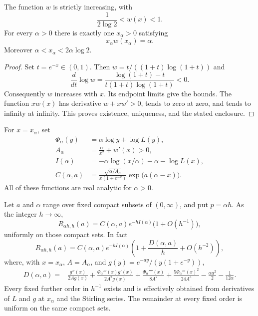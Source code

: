 \begin{lemma}\label{lem:w}
The function $w$ is strictly increasing, with
\[
 \frac1{2\log2}<w(x)<1.
\]
For every $\alpha>0$ there is exactly one $x_\alpha>0$ satisfying
\begin{equation}\label{eq:saddle-equation}
 x_\alpha w(x_\alpha)=\alpha.
\end{equation}
Moreover $\alpha<x_\alpha<2\alpha\log2$.
\end{lemma}
\begin{proof}
Set $t=e^{-x}\in(0,1)$. Then
$w=t/((1+t)\log(1+t))$ and
\[
 \frac{d}{dt}\log w
 =\frac{\log(1+t)-t}{t(1+t)\log(1+t)}<0.
\]
Consequently $w$ increases with $x$. Its endpoint limits give the bounds.
The function $xw(x)$ has derivative $w+xw'>0$, tends to zero at zero,
and tends to infinity at infinity. This proves existence, uniqueness,
and the stated enclosure.
\end{proof}

For $x=x_\alpha$, set
\begin{align}
 \Phi_\alpha(y)&=\alpha\log y+\log L(y),\label{eq:phase}\\
 A_\alpha&=\frac{\alpha}{x^2}+w'(x)>0,\label{eq:A}\\
 I(\alpha)&=-\alpha\log(x/\alpha)-\alpha-\log L(x),\label{eq:rate}\\
 C(\alpha,a)&=
 \frac{\sqrt{\alpha/A_\alpha}}{x(1+e^{-x})}
 \exp\bigl(a(\alpha-x)\bigr).\label{eq:C}
\end{align}
All of these functions are real analytic for $\alpha>0$.

\begin{theorem}\label{thm:saddle}
Let $a$ and $\alpha$ range over fixed compact subsets of $(0,\infty)$,
and put $p=\alpha h$. As the integer $h\to\infty$,
\begin{equation}\label{eq:saddle-leading}
 R_{\alpha h,h}(a)
 =C(\alpha,a)e^{-hI(\alpha)}\bigl(1+O(h^{-1})\bigr),
\end{equation}
uniformly on those compact sets. In fact
\begin{equation}\label{eq:saddle-second}
 R_{\alpha h,h}(a)
 =C(\alpha,a)e^{-hI(\alpha)}
 \left(1+\frac{D(\alpha,a)}h+O(h^{-2})\right),
\end{equation}
where, with $x=x_\alpha$, $A=A_\alpha$, and
$g(y)=e^{-ay}/(y(1+e^{-y}))$,
\begin{align}
 D(\alpha,a)={}&
 \frac{g''(x)}{2Ag(x)}
 +\frac{\Phi_\alpha'''(x)g'(x)}{2A^2g(x)}
 +\frac{\Phi_\alpha''''(x)}{8A^2}
 +\frac{5\Phi_\alpha'''(x)^2}{24A^3}
 -\frac{\alpha a^2}{2}-\frac1{12\alpha}.
 \label{eq:D}
\end{align}
Every fixed further order in $h^{-1}$ exists and is effectively obtained
from derivatives of $L$ and $g$ at $x_\alpha$ and the Stirling series.
The remainder at every fixed order is uniform on the same compact sets.
\end{theorem}

